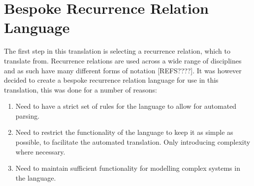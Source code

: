 \documentclass{article}
\begin{document}



\section{Bespoke Recurrence Relation Language} \label{beskoperecurrancerealtion}










The first step in this translation is selecting a recurrence relation, which to translate from. Recurrence relations are used across a wide range of disciplines and as such have many different forms of notation {\color{red} [REFS????]}. It was however decided to create a bespoke recurrence relation language for use in this translation, this was done for a number of reasons:
\begin{enumerate}
  \item Need to have a strict set of rules for the language to allow for automated parsing. 
  \item Need to restrict the functionality of the language to keep it as simple as possible, to facilitate the automated translation. Only introducing complexity where necessary.  
  \item Need to maintain sufficient functionality for modelling complex systems in the language.  
\end{enumerate} 
\end{document}
